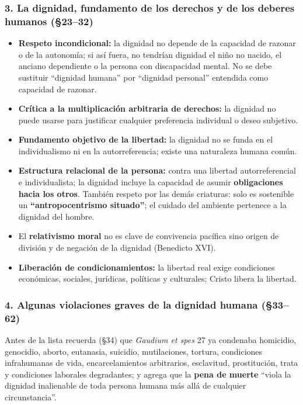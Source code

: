 \documentclass[10pt,a4paper]{article}
\begin{document}
\subsubsection{3. La dignidad, fundamento de los derechos y de los deberes humanos (\S{}23--32)}
\begin{itemize}
\item \textbf{Respeto incondicional:} la dignidad no depende de la capacidad de razonar o de la autonomía; si así fuera, no tendrían dignidad el niño no nacido, el anciano dependiente o la persona con discapacidad mental. No se debe sustituir ``dignidad humana'' por ``dignidad personal'' entendida como capacidad de razonar.
\item \textbf{Crítica a la multiplicación arbitraria de derechos:} la dignidad no puede usarse para justificar cualquier preferencia individual o deseo subjetivo.
\item \textbf{Fundamento objetivo de la libertad:} la dignidad no se funda en el individualismo ni en la autorreferencia; existe una naturaleza humana común.
\item \textbf{Estructura relacional de la persona:} contra una libertad autorreferencial e individualista; la dignidad incluye la capacidad de asumir \textbf{obligaciones hacia los otros}. También respeto por las demás criaturas: solo es sostenible un \textbf{``antropocentrismo situado''}; el cuidado del ambiente pertenece a la dignidad del hombre.
\item El \textbf{relativismo moral} no es clave de convivencia pacífica sino origen de división y de negación de la dignidad (Benedicto XVI).
\item \textbf{Liberación de condicionamientos:} la libertad real exige condiciones económicas, sociales, jurídicas, políticas y culturales; Cristo libera la libertad.
\end{itemize}

\subsubsection{4. Algunas violaciones graves de la dignidad humana (\S{}33--62)}
\noindent Antes de la lista recuerda (\S{}34) que \textit{Gaudium et spes} 27 ya condenaba homicidio, genocidio, aborto, eutanasia, suicidio, mutilaciones, tortura, condiciones infrahumanas de vida, encarcelamientos arbitrarios, esclavitud, prostitución, trata y condiciones laborales degradantes; y agrega que la \textbf{pena de muerte} ``viola la dignidad inalienable de toda persona humana más allá de cualquier circunstancia''.\par\smallskip
\end{document}
